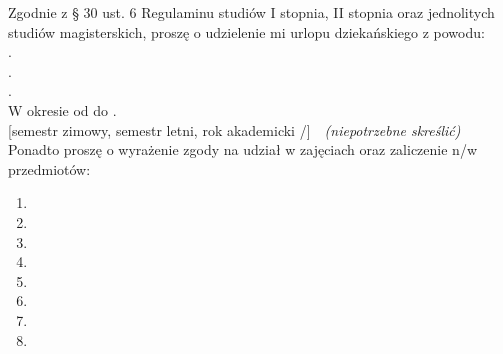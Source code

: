 \documentclass{wmiisubmission}
\begin{document}
\cracowdate
{}
\studentaddress
\addressee[-2cm]{\piotrniemiec}

\vskip 0.5cm


\vskip 0.5cm

Zgodnie z § 30 ust. 6 Regulaminu studiów I stopnia, II stopnia oraz jednolitych
studiów magisterskich, proszę o udzielenie mi urlopu dziekańskiego z powodu:\\
.\dotfill\\
.\dotfill\\
.\dotfill\\
W okresie od \fillField{3cm} do \fillField{3cm}.\\
{[semestr zimowy, semestr letni, rok akademicki \fillField{1cm}/\fillField{1cm}]}~~\textit{(niepotrzebne skreślić)}\\
Ponadto proszę o wyrażenie zgody na udział w zajęciach oraz zaliczenie n/w przedmiotów:

    \begin{multicols}{2}
    \begin{enumerate}
        \item \dotfill
        \item \dotfill
        \item \dotfill
        \item \dotfill
        \item \dotfill
        \item \dotfill
        \item \dotfill
        \item \dotfill
    \end{enumerate}
    \end{multicols}

\vskip 0.3cm

\studentsignature

\vskip 1.0cm


\end{document}
